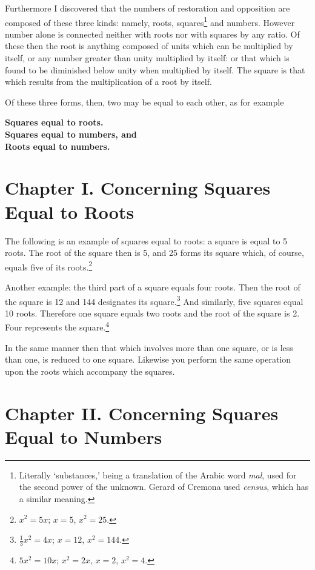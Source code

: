 \documentclass[11pt,a4paper]{book}
\begin{document}
Furthermore I discovered that the numbers of restoration and opposition are composed of these three kinds: namely, roots, squares\footnote{Literally `substances,' being a translation of the Arabic word \textit{mal}, used for the second power of the unknown. Gerard of Cremona used \textit{census}, which has a similar meaning.} and numbers. However number alone is connected neither with roots nor with squares by any ratio. Of these then the root is anything composed of units which can be multiplied by itself, or any number greater than unity multiplied by itself: or that which is found to be diminished below unity when multiplied by itself. The square is that which results from the multiplication of a root by itself.

Of these three forms, then, two may be equal to each other, as for example

\begin{center}
\textbf{Squares equal to roots.}\\
\textbf{Squares equal to numbers, and}\\
\textbf{Roots equal to numbers.}
\end{center}

\section*{Chapter I. Concerning Squares Equal to Roots}

The following is an example of squares equal to roots: a square is equal to 5 roots. The root of the square then is 5, and 25 forms its square which, of course, equals five of its roots.\footnote{$x^2 = 5x$; $x = 5$, $x^2 = 25$.}

Another example: the third part of a square equals four roots. Then the root of the square is 12 and 144 designates its square.\footnote{$\frac{1}{3}x^2 = 4x$; $x = 12$, $x^2 = 144$.} And similarly, five squares equal 10 roots. Therefore one square equals two roots and the root of the square is 2. Four represents the square.\footnote{$5x^2 = 10x$; $x^2 = 2x$, $x = 2$, $x^2 = 4$.}

In the same manner then that which involves more than one square, or is less than one, is reduced to one square. Likewise you perform the same operation upon the roots which accompany the squares.

\section*{Chapter II. Concerning Squares Equal to Numbers}
\end{document}
